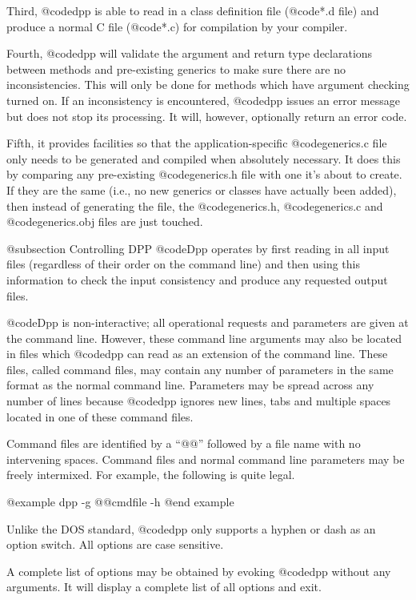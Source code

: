 Third, @code{dpp} is able to read in a class definition file
(@code{*.d} file) and produce a normal C file (@code{*.c})
for compilation by your compiler.

Fourth, @code{dpp} will validate the argument and return type
declarations between methods and pre-existing generics to make sure
there are no inconsistencies.  This will only be done for methods which
have argument checking turned on.  If an inconsistency is encountered,
@code{dpp} issues an error message but does not stop its processing.
It will, however, optionally return an error code.

Fifth, it provides facilities so that the application-specific
@code{generics.c} file only needs to be generated and compiled when
absolutely necessary.  It does this by comparing any pre-existing
@code{generics.h} file with one it's about to create.  If they are the
same (i.e., no new generics or classes have actually been added), then
instead of generating the file, the @code{generics.h}, @code{generics.c}
and @code{generics.obj} files are just touched.


@subsection Controlling DPP
@code{Dpp} operates by first reading in all input files (regardless
of their order on the command line) and then using this information
to check the input consistency and produce any requested output files.

@code{Dpp} is non-interactive; all operational requests and parameters
are given at the command line.  However, these command line arguments
may also be located in files which @code{dpp} can read as an extension
of the command line.  These files, called command files, may contain
any number of parameters in the same format as the normal command line.
Parameters may be spread across any number of lines because @code{dpp}
ignores new lines, tabs and multiple spaces located in one of these
command files.

Command files are identified by a ``@@'' followed by a file name with
no intervening spaces.  Command files and normal command line
parameters may be freely intermixed.  For example, the following
is quite legal.

@example
        dpp -g @@cmdfile -h
@end example

Unlike the DOS standard, @code{dpp} only supports a hyphen or dash
as an option switch.  All options are case sensitive.

A complete list of options may be obtained by evoking @code{dpp} without
any arguments.  It will display a complete list of all options and
exit.

